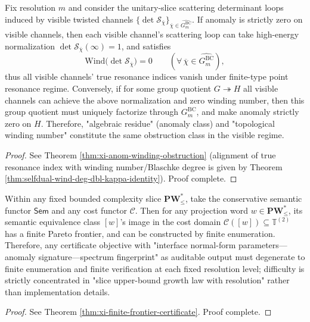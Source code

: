 \begin{conclusion}\label{con:xi-terminal-anom-winding-obstruction-equivalence}
Fix resolution \(m\) and consider the unitary-slice scattering determinant loops induced by visible twisted channels
\(\{\det\mathcal S_{\overline\chi}\}_{\overline\chi\in\widehat{G^{\mathrm{BC}}_m}}\).
If anomaly is strictly zero on visible channels, then each visible channel's scattering loop can take high-energy normalization
\(\det\mathcal S_{\overline\chi}(\infty)=1\), and satisfies
\[
\mathrm{Wind}\bigl(\det\mathcal S_{\overline\chi}\bigr)=0
\qquad(\forall\,\overline\chi\in\widehat{G^{\mathrm{BC}}_m}),
\]
thus all visible channels' true resonance indices vanish under finite-type point resonance regime.
Conversely, if for some group quotient \(G\twoheadrightarrow H\) all visible channels can achieve the above normalization and zero winding number, then this group quotient must uniquely factorize through \(G^{\mathrm{BC}}_m\), and make anomaly strictly zero on \(H\).
Therefore, "algebraic residue" (anomaly class) and "topological winding number" constitute the same obstruction class in the visible regime.
\end{conclusion}
\begin{proof}[Proof]
See Theorem \ref{thm:xi-anom-winding-obstruction} (alignment of true resonance index with winding number/Blaschke degree is given by Theorem \ref{thm:selfdual-wind-deg-dbl-kappa-identity}). Proof complete.
\end{proof}

\begin{conclusion}\label{con:xi-terminal-finite-frontier-principle}
Within any fixed bounded complexity slice \(\mathbf{PW}^{\ast}_{\le}\), take the conservative semantic functor \(\mathsf{Sem}\) and any cost functor \(\mathcal{C}\).
Then for any projection word \(w\in \mathbf{PW}^{\ast}_{\le}\), its semantic equivalence class \([w]\)'s image in the cost domain \(\mathcal{C}([w])\subseteq \mathbb{T}^{(2)}\) has a finite Pareto frontier, and can be constructed by finite enumeration.
Therefore, any certificate objective with "interface normal-form parameters—anomaly signature—spectrum fingerprint" as auditable output must degenerate to finite enumeration and finite verification at each fixed resolution level; difficulty is strictly concentrated in "slice upper-bound growth law with resolution" rather than implementation details.
\end{conclusion}
\begin{proof}[Proof]
See Theorem \ref{thm:xi-finite-frontier-certificate}. Proof complete.
\end{proof}

